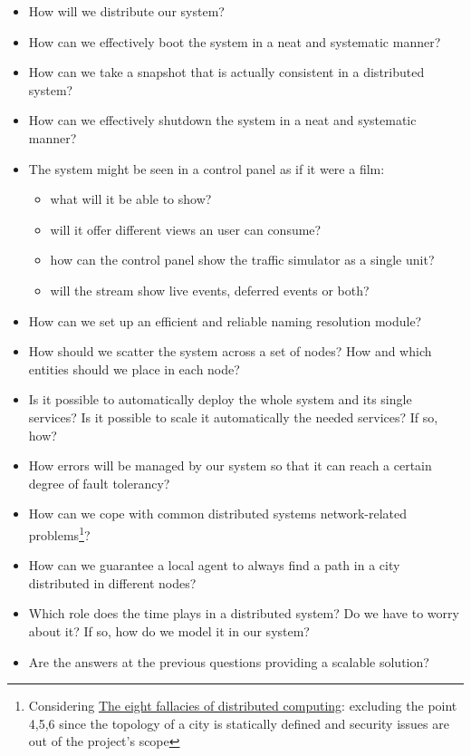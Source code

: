 \begin{itemize}
\item How will we distribute our system?
\item How can we effectively boot the system in a neat and systematic manner?
\item How can we take a snapshot that is actually consistent in a distributed
  system?
\item How can we effectively shutdown the system in a neat and systematic
  manner?
\item The system might be seen in a control panel as if it were a film:
  \begin{itemize}
  \item what will it be able to show?
  \item will it offer different views an user can consume?
  \item how can the control panel show the traffic simulator as a
    single unit?
  \item will the stream show live events, deferred events or both?
  \end{itemize}
\item How can we set up an efficient and reliable naming resolution module?
\item How should we scatter the system across a set of nodes? How and which
  entities should we place in each node?
\item Is it possible to automatically deploy the whole system and its single
services? Is it possible to scale it automatically the needed services?
If so, how?
\item How errors will be managed by our system so that it can reach a certain
  degree of fault tolerancy?
\item How can we cope with common distributed systems network-related
  problems\footnote{Considering \href{https://blogs.oracle.com/jag/resource/Fallacies.html?cm_mc_uid=82650292107114582847614&cm_mc_sid_50200000=1458564821}{The eight fallacies of distributed computing}: excluding the point 4,5,6
  since the topology of a city is statically defined and security issues are
  out of the project's scope}?
\item How can we guarantee a local agent to always find a path in
a city distributed in different nodes?
\item Which role does the time plays in a distributed system? Do we have to
worry about it? If so, how do we model it in our system?
\item Are the answers at the previous questions providing a scalable solution?
\end{itemize}

